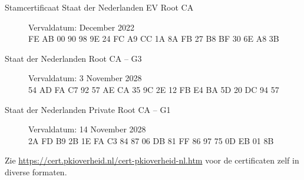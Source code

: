 \documentclass[11.0pt]{report}
\begin{document}
\begin{description}
\item[Stamcertificaat Staat der Nederlanden EV Root CA]  Vervaldatum: December 2022 \\

FE AB 00 90 98 9E 24 FC A9 CC 1A 8A FB 27 B8 BF 30 6E A8 3B \\

\item[Staat der Nederlanden Root CA -- G3] Vervaldatum: 3 November 2028 \\

54 AD FA C7 92 57 AE CA 35 9C 2E 12 FB E4 BA 5D 20 DC 94 57 \\

\item[Staat der Nederlanden Private Root CA -- G1] Vervaldatum: 14 November 2028  \\

2A FD B9 2B 1E FA C3 84 87 06 DB 81 FF 86 97 75 0D EB 01 8B \\
\end{description}

Zie \url{https://cert.pkioverheid.nl/cert-pkioverheid-nl.htm} voor de certificaten zelf in diverse formaten.
\end{document}
